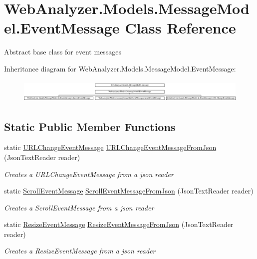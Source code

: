 \hypertarget{class_web_analyzer_1_1_models_1_1_message_model_1_1_event_message}{}\section{Web\+Analyzer.\+Models.\+Message\+Model.\+Event\+Message Class Reference}
\label{class_web_analyzer_1_1_models_1_1_message_model_1_1_event_message}


Abstract base class for event messages  


Inheritance diagram for Web\+Analyzer.\+Models.\+Message\+Model.\+Event\+Message\+:\begin{figure}[H]
\begin{center}
\leavevmode
\includegraphics[height=1.138211cm]{class_web_analyzer_1_1_models_1_1_message_model_1_1_event_message}
\end{center}
\end{figure}
\subsection*{Static Public Member Functions}
\begin{DoxyCompactItemize}
\item 
static \hyperlink{class_web_analyzer_1_1_models_1_1_message_model_1_1_in_1_1_event_messages_1_1_u_r_l_change_event_message}{U\+R\+L\+Change\+Event\+Message} \hyperlink{class_web_analyzer_1_1_models_1_1_message_model_1_1_event_message_a971a2b704c5e6ef67a48b2836d53fccb}{U\+R\+L\+Change\+Event\+Message\+From\+Json} (Json\+Text\+Reader reader)
\begin{DoxyCompactList}\small\item\em Creates a U\+R\+L\+Change\+Event\+Message from a json reader \end{DoxyCompactList}\item 
static \hyperlink{class_web_analyzer_1_1_models_1_1_message_model_1_1_in_1_1_event_messages_1_1_scroll_event_message}{Scroll\+Event\+Message} \hyperlink{class_web_analyzer_1_1_models_1_1_message_model_1_1_event_message_a3c2e13ff9e1eba07492ee1406814077d}{Scroll\+Event\+Message\+From\+Json} (Json\+Text\+Reader reader)
\begin{DoxyCompactList}\small\item\em Creates a Scroll\+Event\+Message from a json reader \end{DoxyCompactList}\item 
static \hyperlink{class_web_analyzer_1_1_models_1_1_message_model_1_1_in_1_1_event_messages_1_1_resize_event_message}{Resize\+Event\+Message} \hyperlink{class_web_analyzer_1_1_models_1_1_message_model_1_1_event_message_af72ae6f9dc1fec4f1c9ea68a90643be7}{Resize\+Event\+Message\+From\+Json} (Json\+Text\+Reader reader)
\begin{DoxyCompactList}\small\item\em Creates a Resize\+Event\+Message from a json reader \end{DoxyCompactList}\end{DoxyCompactItemize}
